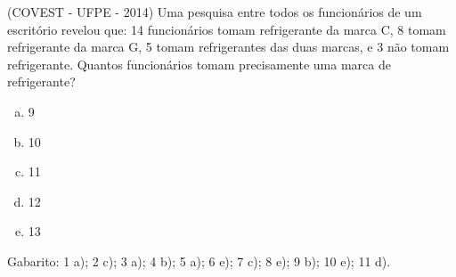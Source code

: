 \begin{exer}
(COVEST - UFPE - 2014)  Uma pesquisa entre todos os funcionários de um escritório revelou que: 14 funcionários tomam refrigerante da marca C, 8 tomam refrigerante da marca G, 5 tomam refrigerantes das duas marcas, e 3 não tomam refrigerante. Quantos funcionários tomam precisamente uma marca de refrigerante?
\begin{enumerate}[a)]
\item 9
\item 10
\item 11
\item 12
\item 13
\end{enumerate}
\end{exer}

 Gabarito:
 1 a); 2 c); 3 a); 4 b); 5 a); 6 e); 7 c); 8 e); 9 b); 10 e); 11 d).
